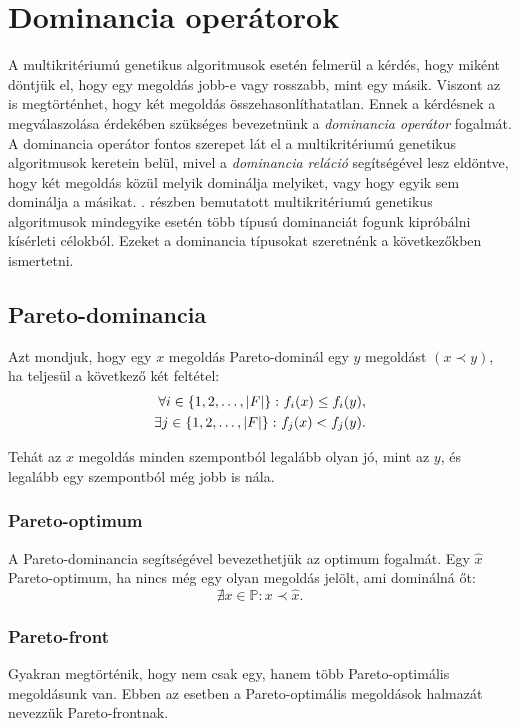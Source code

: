 \section{Dominancia operátorok}
A multikritériumú genetikus algoritmusok esetén felmerül a kérdés, hogy miként döntjük el, hogy egy megoldás jobb-e vagy rosszabb, mint egy másik.
Viszont az is megtörténhet, hogy két megoldás összehasonlíthatatlan.
Ennek a kérdésnek a megválaszolása érdekében szükséges bevezetnünk a \textit{dominancia operátor} fogalmát.
A dominancia operátor fontos szerepet lát el a multikritériumú genetikus algoritmusok keretein belül,
mivel a \textit{dominancia reláció} segítségével lesz eldöntve, hogy két megoldás közül melyik dominálja melyiket, vagy hogy egyik sem dominálja a másikat.
. részben bemutatott multikritériumú genetikus algoritmusok mindegyike esetén több típusú dominanciát fogunk kipróbálni kísérleti célokból.
Ezeket a dominancia típusokat szeretnénk a következőkben ismertetni.


\subsection{Pareto-dominancia}
Azt mondjuk, hogy egy $x$ megoldás Pareto-dominál egy $y$ megoldást $\left( x \prec y \right)$, ha teljesül a következő két feltétel:
\begin{align*}
  \forall i \in \left\{ 1, 2, \dots, \lvert F\rvert \right\} \colon f_i(x) \leq f_i(y), \\
  \exists j \in \left\{ 1, 2, \dots, \lvert F\rvert \right\} \colon f_j(x) < f_j(y).
\end{align*}

Tehát az $x$ megoldás minden szempontból legalább olyan jó, mint az $y$, és legalább egy szempontból még jobb is nála.


\subsubsection{Pareto-optimum}
A Pareto-dominancia segítségével bevezethetjük az optimum fogalmát.
Egy $\hat{x}$ Pareto-optimum, ha nincs még egy olyan megoldás jelölt, ami dominálná őt:
\[
  \nexists x \in \mathbb{P} \colon x \prec \hat{x}.
\]


\subsubsection{Pareto-front}
Gyakran megtörténik, hogy nem csak egy, hanem több Pareto-optimális megoldásunk van.
Ebben az esetben a Pareto-optimális megoldások halmazát nevezzük Pareto-frontnak.


